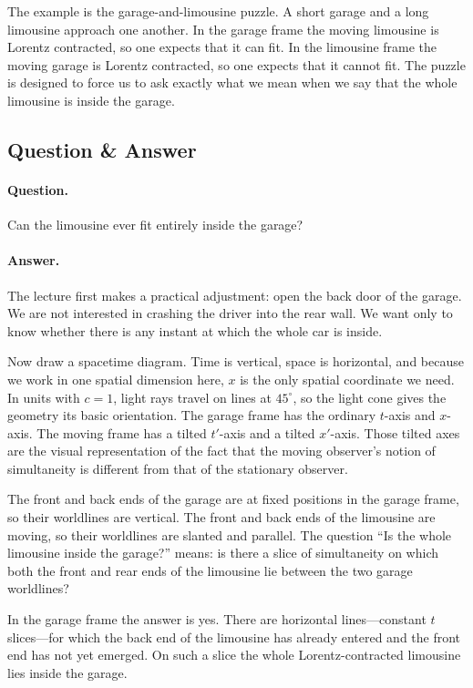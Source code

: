 The example is the garage-and-limousine puzzle. A short garage and a long limousine approach one another. In the garage frame the moving limousine is Lorentz contracted, so one expects that it can fit. In the limousine frame the moving garage is Lorentz contracted, so one expects that it cannot fit. The puzzle is designed to force us to ask exactly what we mean when we say that the whole limousine is inside the garage.

\subsection{Question \& Answer}

\paragraph{Question.}
Can the limousine ever fit entirely inside the garage?

\paragraph{Answer.}
The lecture first makes a practical adjustment: open the back door of the garage. We are not interested in crashing the driver into the rear wall. We want only to know whether there is any instant at which the whole car is inside.

Now draw a spacetime diagram. Time is vertical, space is horizontal, and because we work in one spatial dimension here, \(x\) is the only spatial coordinate we need. In units with \(c=1\), light rays travel on lines at \(45^\circ\), so the light cone gives the geometry its basic orientation. The garage frame has the ordinary \(t\)-axis and \(x\)-axis. The moving frame has a tilted \(t'\)-axis and a tilted \(x'\)-axis. Those tilted axes are the visual representation of the fact that the moving observer's notion of simultaneity is different from that of the stationary observer.

The front and back ends of the garage are at fixed positions in the garage frame, so their worldlines are vertical. The front and back ends of the limousine are moving, so their worldlines are slanted and parallel. The question ``Is the whole limousine inside the garage?'' means: is there a slice of simultaneity on which both the front and rear ends of the limousine lie between the two garage worldlines?

In the garage frame the answer is yes. There are horizontal lines---constant \(t\) slices---for which the back end of the limousine has already entered and the front end has not yet emerged. On such a slice the whole Lorentz-contracted limousine lies inside the garage.

